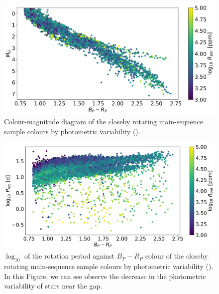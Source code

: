 \begin{figure}
\centering
  \includegraphics[width=\textwidth]{Figures/rot_gap_figures/HR.png}
  \caption[Colour-magnitude diagram of the closeby rotating main-sequence sample colours by photometric variability (\rper{}).]{
  Colour-magnitude diagram of the closeby rotating main-sequence sample colours by photometric variability (\rper{}).}
  \label{fig:hr}
\end{figure}

\begin{figure}
\centering
  \includegraphics[width=\textwidth]{Figures/rot_gap_figures/rotational_dist.png}
  \caption[$\log_{10}$ of the rotation period against \gaia{} $B_P-R_P$ colour of the closeby rotating main-sequence sample colours by photometric variability (\rper{}).]{
  $\log_{10}$ of the rotation period against \gaia $B_P-R_P$ colour of the closeby rotating main-sequence sample colours by photometric variability (\rper{}). 
In this Figure, we can see observe the decrease in the photometric variability of stars near the gap.}
  \label{fig:prawn}
\end{figure}

